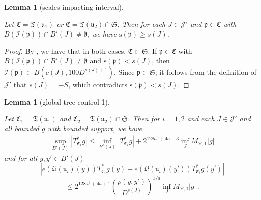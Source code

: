 \documentclass[10pt,a4paper]{article}
\theoremstyle{plain}
\newtheorem{lemma}[theorem]{Lemma}
\theoremstyle{definition}
\numberwithin{equation}{subsection}
\newcommand{\fp}{{\mathfrak p}}
\newcommand{\fu}{{\mathfrak u}}
\newcommand{\fT}{{\mathfrak T}}
\newcommand{\fC}{{\mathfrak C}}
\newcommand{\ps}{{\mathrm{s}}}
\newcommand{\scI}{{\mathcal{I}}} %
\newcommand{\fcc}{{\mathcal{Q}}}
\newcommand{\lean}[1]{}
\newcommand{\uses}[1]{}
\newcommand{\leanok}{}
\begin{document}
    \begin{lemma}[scales impacting interval]
        \label{scales-impacting-interval}
        \leanok
        \lean{TileStructure.Forest.scales_impacting_interval}
        \uses{overlap-implies-distance}
        Let $\fC = \fT(\fu_1)$ or $\fC = \fT(\fu_2) \cap \mathfrak{S}$. Then for each $J \in \mathcal{J}'$ and $\fp \in \fC$ with $B(\scI(\fp)) \cap B'(J) \neq \emptyset$, we have $\ps(\fp) \ge s(J)$.
    \end{lemma}

    \begin{proof}
        \leanok
        By , we have that in both cases, $\fC \subset \mathfrak{S}$. If $\fp \in \fC$ with $B(\scI(\fp)) \cap B'(J) \neq \emptyset$ and $\ps(\fp) < s(J)$, then $\scI(\fp) \subset B(c(J), 100 D^{s(J) + 1})$. Since $\fp \in \mathfrak{S}$, it follows from the definition of $\mathcal{J}'$ that $s(J) = -S$, which contradicts $\ps(\fp) < s(J)$.
    \end{proof}

    \begin{lemma}[global tree control 1]
        \label{global-tree-control-1}
        \leanok
        \lean{TileStructure.Forest.global_tree_control1_edist_left, TileStructure.Forest.global_tree_control1_edist_right, TileStructure.Forest.global_tree_control1_supbound}
        \uses{Holder-correlation-tile,scales-impacting-interval}
        Let $\fC_1 = \fT(\fu_1)$ and $\fC_2 = \fT(\fu_2) \cap \mathfrak{S}$. Then for $i = 1,2$ and each $J \in \mathcal{J}'$ and all bounded $g$ with bounded support, we have
        \begin{align}
            \label{TreeUB}
            \sup_{B'(J)} |T_{\fC_i}^*g| \leq \inf_{B^\circ{}(J)} |T^*_{\fC_i} g| + 2^{128a^3+4a+3} \inf_{J} M_{\mathcal{B}, 1} |g|
        \end{align}
        and for all $y,y' \in B'(J)$
        $$
            |e(\fcc(\fu_i)(y)) T_{\fC_i}^* g(y) - e(\fcc(\fu_i)(y')) T_{\fC_i}^* g(y')|
        $$
        \begin{equation}
            \label{TreeHolder}
             \le 2^{128a^3+4a+1} \left(\frac{\rho(y,y')}{D^{s(J)}}\right)^{1/a} \inf_J M_{\mathcal{B},1} |g|\,.
        \end{equation}
    \end{lemma}
\end{document}
